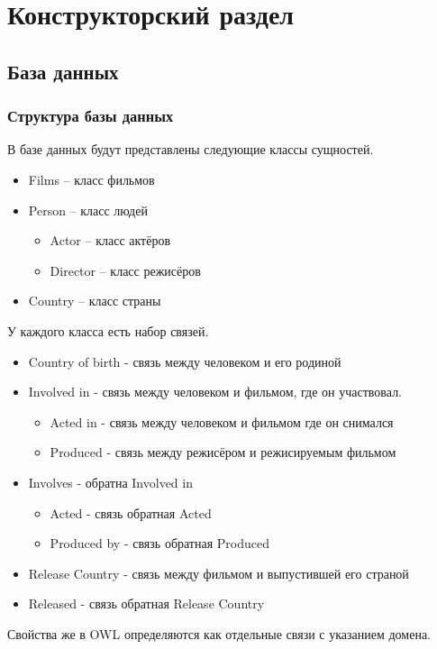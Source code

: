 \chapter{Конструкторский раздел}
\label{cha:design}
\section{База данных}
\subsection{Структура базы данных}
В базе данных будут представлены следующие классы сущностей.
\begin{itemize}
\item Films -- класс фильмов
\item Person -- класс людей
\begin{itemize}
\item Actor -- класс актёров
\item Director -- класс режисёров
\end{itemize}
\item Country -- класс страны
\end{itemize}
У каждого класса есть набор связей.
\begin{itemize}
\item Country of birth - связь между человеком и его родиной
\item Involved in - связь между человеком и фильмом, где он участвовал.
\begin{itemize}
\item Acted in - связь между человеком и фильмом где он снимался
\item Produced - связь между режисёром и режисируемым фильмом 
\end{itemize}
\item Involves - обратна Involved in
\begin{itemize}
\item Acted - связь обратная Acted
\item Produced by  - связь обратная Produced
\end{itemize}
\item Release Country - связь между фильмом и выпустившей его страной 
\item Released - связь обратная Release Country
\end{itemize}
Свойства же в OWL определяются как отдельные связи с указанием домена.
